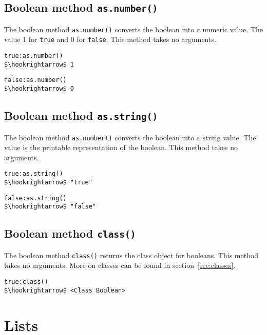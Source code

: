 \documentclass[11pt,a4paper]{scrbook}
\begin{document}
\subsection{Boolean method \texttt{as.number()}}

The boolean method \texttt{as.number()} converts the boolean into a numeric
value. The value 1 for \verb|true| and 0 for \verb|false|. This method takes
no arguments.

\begin{lstlisting}[language=BibTool,mathescape=true]
true:as.number()
$\hookrightarrow$ 1
\end{lstlisting}

\begin{lstlisting}[language=BibTool,mathescape=true]
false:as.number()
$\hookrightarrow$ 0
\end{lstlisting}

\subsection{Boolean method \texttt{as.string()}}

The boolean method \texttt{as.number()} converts the boolean into a string
value. The value is the printable representation of the boolean. This method
takes no arguments.

\begin{lstlisting}[language=BibTool,mathescape=true]
true:as.string()
$\hookrightarrow$ "true"
\end{lstlisting}

\begin{lstlisting}[language=BibTool,mathescape=true]
false:as.string()
$\hookrightarrow$ "false"
\end{lstlisting}

\subsection{Boolean method \texttt{class()}}

The boolean method \texttt{class()} returns the class object for booleans.
This method takes no arguments. More on classes can be found in
section~\ref{sec:classes}.

\begin{lstlisting}[language=BibTool,mathescape=true]
true:class()
$\hookrightarrow$ <Class Boolean>
\end{lstlisting}


\section{Lists}
\end{document}
